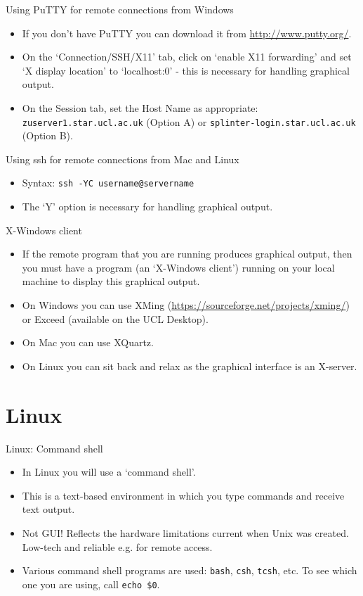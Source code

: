 \documentclass{beamer}
\begin{document}
\begin{frame}{Using PuTTY for remote connections from Windows}
  \begin{itemize}
    \item If you don't have PuTTY you can download it from \url{http://www.putty.org/}.
    \item On the `Connection/SSH/X11' tab, click on `enable X11 forwarding' and set `X display location' to `localhost:0' - this is necessary for handling graphical output.
    \item On the Session tab, set the Host Name as appropriate: \texttt{zuserver1.star.ucl.ac.uk} (Option A) or \texttt{splinter-login.star.ucl.ac.uk} (Option B).
  \end{itemize}
\end{frame}

\begin{frame}{Using ssh for remote connections from Mac and Linux}
  \begin{itemize}
    \item Syntax: \alert{\texttt{ssh -YC username@servername}}
    \item The `Y' option is necessary for handling graphical output.
  \end{itemize}
\end{frame}

\begin{frame}{X-Windows client}
  \begin{itemize}
    \item If the remote program that you are running produces graphical output, then you must have a program (an `X-Windows client') running on your local machine to display this graphical output.
    \item On Windows you can use XMing (\url{https://sourceforge.net/projects/xming/}) or Exceed (available on the UCL Desktop).
    \item On Mac you can use XQuartz.
    \item On Linux you can sit back and relax as the graphical interface is an X-server.
  \end{itemize}
\end{frame}


\section{Linux}

\begin{frame}{Linux: Command shell}
  \begin{itemize}
    \item{In Linux you will use a `command shell'.}
    \item{This is a text-based environment in which you type commands and receive text output.}
    \item{Not GUI! Reflects the hardware limitations current when Unix was created. Low-tech and reliable e.g. for remote access.}
    \item{Various command shell programs are used: \texttt{bash}, \texttt{csh}, \texttt{tcsh}, etc. To see which one you are using, call \texttt{echo \$0}.}
   \end{itemize}
\end{frame}
\end{document}
